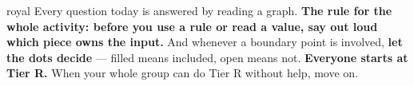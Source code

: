 \documentclass[10pt]{article}
\begin{document}

\vspace{0.15in}

\begin{scenariobox}{royal}
\small
Every question today is answered by reading a graph. \textbf{The rule for the whole activity: before
you use a rule or read a value, say out loud which piece owns the input.} And whenever a boundary
point is involved, \textbf{let the dots decide} --- filled means included, open means not.
\textbf{Everyone starts at Tier R.} When your whole group can do Tier R without help, move on.
\end{scenariobox}

\vspace{0.10in}
\end{document}
